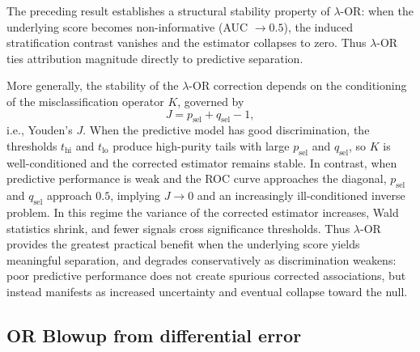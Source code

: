 \documentclass[pdflatex,sn-mathphys-num]{sn-jnl}%
\theoremstyle{thmstyleone}%
\theoremstyle{thmstyletwo}%
\theoremstyle{thmstylethree}%
\begin{document}
The preceding result establishes a structural stability property of $\lambda$-OR: 
when the underlying score becomes non-informative (AUC $\to 0.5$), 
the induced stratification contrast vanishes and the estimator collapses to zero. 
Thus $\lambda$-OR ties attribution magnitude directly to predictive separation.

More generally, the stability of the $\lambda$-OR correction depends on the conditioning of the misclassification operator $K$, governed by
\[
J = p_{\mathrm{sel}} + q_{\mathrm{sel}} - 1,
\]
i.e., Youden's $J$. When the predictive model has good discrimination, the thresholds $t_{\mathrm{hi}}$ and $t_{\mathrm{lo}}$ produce high-purity tails with large $p_{\mathrm{sel}}$ and $q_{\mathrm{sel}}$, so $K$ is well-conditioned and the corrected estimator remains stable. In contrast, when predictive performance is weak and the ROC curve approaches the diagonal, $p_{\mathrm{sel}}$ and $q_{\mathrm{sel}}$ approach $0.5$, implying $J \to 0$ and an increasingly ill-conditioned inverse problem. In this regime the variance of the corrected estimator increases, Wald statistics shrink, and fewer signals cross significance thresholds. Thus $\lambda$-OR provides the greatest practical benefit when the underlying score yields meaningful separation, and degrades conservatively as discrimination weakens: poor predictive performance does not create spurious corrected associations, but instead manifests as increased uncertainty and eventual collapse toward the null.


\subsection{OR Blowup from differential error}
\end{document}
